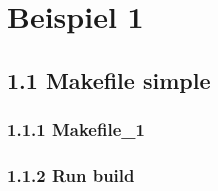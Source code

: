 \documentclass{report}
\newcommand{\name}{Marco Söllinger}
\newcommand{\matnr}{s2410306011}
\newcommand{\uebungsgruppe}{Gruppe 1}
\newcommand{\aufwand}{2}
\begin{document}

%

\section*{Beispiel 1}

\subsection*{1.1 Makefile simple}


\subsubsection*{1.1.1 Makefile\_1}



\subsubsection*{1.1.2 Run build}
\end{document}
